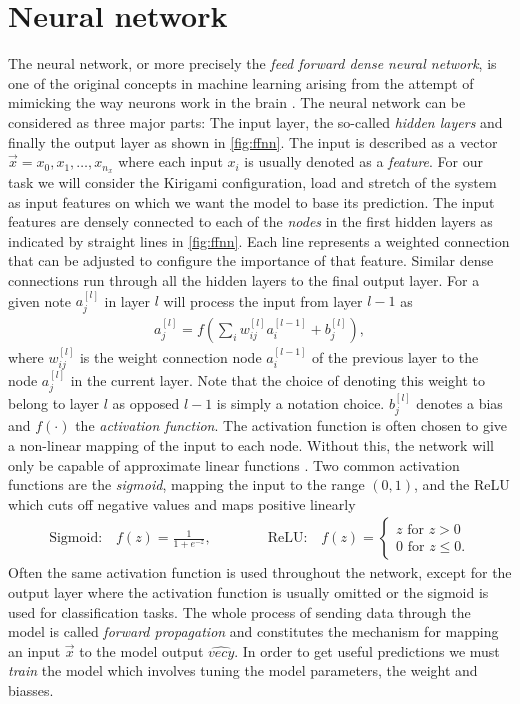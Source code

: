 \section{Neural network}\label{sec:NN}
The neural network, or more precisely the \textit{feed forward dense neural
network}, is one of the original concepts in machine learning arising from the attempt of mimicking the way neurons work in the brain \cite{lederer2021activation, Shankar_2022}. The neural network can be considered as three major parts: The input layer, the
so-called \textit{hidden layers} and finally the output layer as shown in
\cref{fig:ffnn}. The input is described as a vector $\vec{x} = x_0, x_1, \ldots,
x_{n_x}$ where each input $x_i$ is usually denoted as a \textit{feature}. For
our task we will consider the Kirigami configuration, load and stretch of the system as input features on which we want the model to base its prediction. The
input features are densely connected to each of the \textit{nodes} in the first
hidden layers as indicated by straight lines in \cref{fig:ffnn}. Each line
represents a weighted connection that can be adjusted to configure the
importance of that feature. Similar dense connections run through all the
hidden layers to the final output layer. For a given note $a_j^{[l]}$ in layer $l$ will process the input from layer $l-1$ as
\begin{align*}
  a_j^{[l]} = f\left(\sum_i w^{[l]}_{ij}a_i^{[l-1]} + b_j^{[l]}\right),
\end{align*}
where $w^{[l]}_{ij}$ is the weight connection node $a_i^{[l-1]}$ of the previous layer to the node $a_j^{[l]}$ in the current layer. Note that the choice of denoting this weight to belong to layer $l$ as opposed $l-1$ is simply a notation choice. $b_j^{[l]}$ denotes a bias and $f(\cdot)$ the \textit{activation function}. The activation function is often chosen to give a non-linear mapping of the input to each node. Without this, the network will only be capable of approximate linear functions \cite{lederer2021activation}. Two common activation functions are the \textit{sigmoid}, mapping the input to the range $(0,1)$, and the ReLU which cuts off negative values and maps positive linearly
\begin{align*}
  \text{Sigmoid:} \quad f(z) = \frac{1}{1 + e^{-z}}, \qquad \qquad
  \text{ReLU:} \quad 
  f(z)= \begin{cases}
    z \text{ for } z > 0   \\
    0 \text{ for } z \leq 0.
    \end{cases}
\end{align*}
Often the same activation function is used throughout the network, except for the output layer where the activation function is usually omitted or the sigmoid is used for classification tasks. The whole process of sending data through the model is called \textit{forward propagation} and constitutes the mechanism for mapping an input $\vec{x}$ to the model output $\hat{vec{y}}$. In order to get useful predictions we must \textit{train} the model which involves tuning the model parameters, the weight and biasses.


